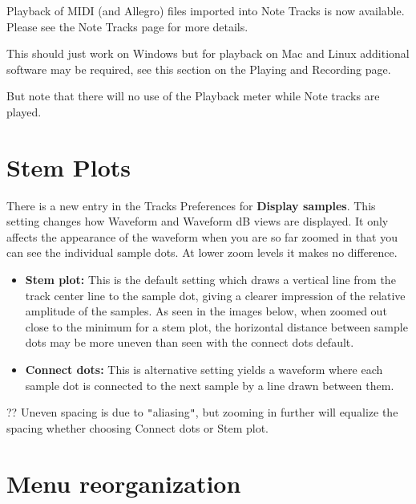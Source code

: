 Playback of MIDI (and Allegro) files imported into Note Tracks is now available.  Please see the Note Tracks page for more details.

This should just work on Windows but for playback on Mac and Linux additional software may be required, see this section on the Playing and Recording page.

But note that there will no use of the Playback meter while Note tracks are played. 



\section{
Stem Plots
}


There is a new entry in the Tracks Preferences for \textbf{Display samples}.  This setting changes how Waveform and Waveform dB views are displayed.  It only affects the appearance of the waveform when you are so far zoomed in that you can see the individual sample dots.  At lower zoom levels it makes no difference.  
\begin{itemize}
\item \textbf{Stem plot:} This is the default setting which draws a vertical line from the track center line to the sample dot, giving a clearer impression of the relative amplitude of the samples. As seen in the images below, when zoomed out close to the minimum for a stem plot, the horizontal distance between sample dots may be more uneven than seen with the connect dots default.   
\item \textbf{Connect dots:} This is alternative setting yields a waveform where each sample dot is connected to the next sample by a line drawn between them.  
\end{itemize}


??
Uneven spacing is due to \texttt{{}"{}}aliasing\texttt{{}"{}}, but zooming in further will equalize the spacing whether choosing Connect dots or Stem plot.





\section{
Menu reorganization
}



